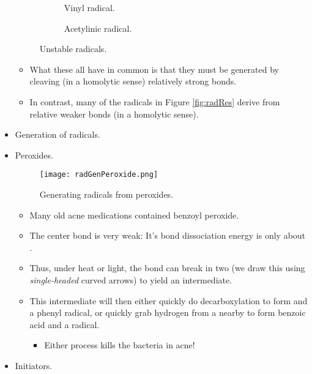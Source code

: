 \documentclass[../notes.tex]{subfiles}
\begin{document}
\begin{itemize}
\begin{figure}[h!]
\begin{subfigure}[b]{0.2\linewidth}
            \centering
            \caption{Vinyl radical.}
            \label{fig:radUnstableb}
        \end{subfigure}
        \begin{subfigure}[b]{0.2\linewidth}
            \centering
            \caption{Acetylinic radical.}
            \label{fig:radUnstablec}
        \end{subfigure}
        \caption{Unstable radicals.}
        \label{fig:radUnstable}
    \end{figure}
    \begin{itemize}
        \item What these all have in common is that they must be generated by cleaving (in a homolytic sense) relatively strong  bonds.
        \item In contrast, many of the radicals in Figure \ref{fig:radRes} derive from relative weaker  bonds (in a homolytic sense).
    \end{itemize}
    \item Generation of radicals.
    \item Peroxides.
    \begin{figure}[h!]
        \centering
        \texttt{[image: radGenPeroxide.png]}
        \caption{Generating radicals from peroxides.}
        \label{fig:radGenPeroxide}
    \end{figure}
    \begin{itemize}
        \item Many old acne medications contained benzoyl peroxide.
        \item The center  bond is very weak: It's bond dissociation energy is only about .
        \item Thus, under heat or light, the  bond can break in two (we draw this using \emph{single-headed} curved arrows) to yield an intermediate.
        \item This intermediate will then either quickly do decarboxylation to form  and a phenyl radical, or quickly grab hydrogen from a nearby  to form benzoic acid and a  radical.
        \begin{itemize}
            \item Either process kills the bacteria in acne!
        \end{itemize}
    \end{itemize}
    \item Initiators.

\end{itemize}
\end{document}
